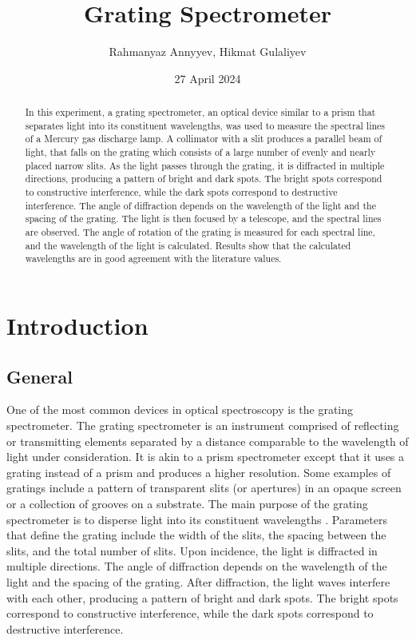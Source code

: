 \documentclass[10pt]{article}
\title{Grating Spectrometer}
\author{Rahmanyaz Annyyev, Hikmat Gulaliyev}
\date{27 April 2024}
\begin{document}
\maketitle

\begin{abstract}

In this experiment, a grating spectrometer, an optical device similar to a prism that separates light into its constituent wavelengths, was used to measure the spectral lines of a Mercury gas discharge lamp. A collimator with a slit produces a parallel beam of light, that falls on the grating which consists of a large number of evenly and nearly placed narrow slits. As the light passes through the grating, it is diffracted in multiple directions, producing a pattern of bright and dark spots. The bright spots correspond to constructive interference, while the dark spots correspond to destructive interference. The angle of diffraction depends on the wavelength of the light and the spacing of the grating. The light is then focused by a telescope, and the spectral lines are observed. The angle of rotation of the grating is measured for each spectral line, and the wavelength of the light is calculated. Results show that the calculated wavelengths are in good agreement with the literature values.

\end{abstract}

\section{Introduction}

\subsection*{General}

One of the most common devices in optical spectroscopy is the grating spectrometer. The grating spectrometer is an instrument comprised of reflecting or transmitting elements separated by a distance comparable to the wavelength of light under consideration. It is akin to a prism spectrometer except that it uses a grating instead of a prism and produces a higher resolution. Some examples of gratings include a pattern of transparent slits (or apertures) in an opaque screen or a collection of grooves on a substrate. The main purpose of the grating spectrometer is to disperse light into its constituent wavelengths \cite{Palmer_2020}. Parameters that define the grating include the width of the slits, the spacing between the slits, and the total number of slits. Upon incidence, the light is diffracted in multiple directions. The angle of diffraction depends on the wavelength of the light and the spacing of the grating. After diffraction, the light waves interfere with each other, producing a pattern of bright and dark spots. The bright spots correspond to constructive interference, while the dark spots correspond to destructive interference. 
\end{document}
